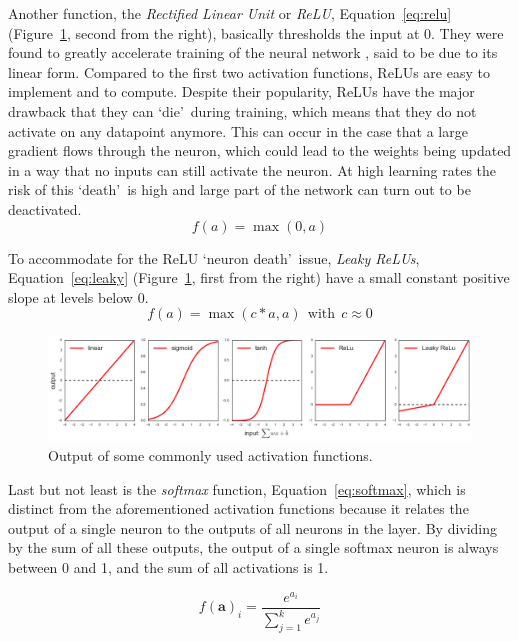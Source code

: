 Another function, the \textit{Rectified Linear Unit} or \textit{ReLU}, Equation~\ref{eq:relu} (Figure~\ref{fig:actifun}, second from the right), basically thresholds the input at 0. They were found to greatly accelerate training of the neural network \cite{Krizhevsky2012}, said to be due to its linear form. Compared to the first two activation functions, ReLUs are easy to implement and to compute. Despite their popularity, ReLUs have the major drawback that they can \textquoteleft die\textquoteright\   during training, which means that they do not activate on any datapoint anymore. This can occur in the case that a large gradient flows through the neuron, which could lead to the weights being updated in a way that no inputs can still activate the neuron. At high learning rates the risk of this \textquoteleft death\textquoteright\   is high and large part of the network can turn out to be deactivated.
\begin{equation} \label{eq:relu}
f(a) = \max(0, a)
\end{equation}

To accommodate for the ReLU \textquoteleft neuron death\textquoteright\   issue, \textit{Leaky ReLUs}, Equation~\ref{eq:leaky} (Figure~\ref{fig:actifun}, first from the right) have a small constant positive slope at levels below 0.
\begin{equation} \label{eq:leaky}
f(a) = \max(c\ast a, a) \ \ \mathrm{with}\ \  c\approx 0
\end{equation}

\begin{figure}[h]
	\includegraphics[width=\textwidth]{../figures/actiFunc}
	\caption{Output of some commonly used activation functions. \label{fig:actifun}}
\end{figure}
Last but not least is the \textit{softmax} function, Equation~\ref{eq:softmax}, which is distinct from the aforementioned activation functions because it relates the output of a single neuron to the outputs of all neurons in the layer. By dividing by the sum of all these outputs, the output of a single softmax neuron is always between 0 and 1, and the sum of all activations is 1. 

\begin{equation}\label{eq:softmax}
f(\mathbf{a})_i = \frac{e^{a_i}}{\sum_{j=1}^k e^{a_j}}
\end{equation}

